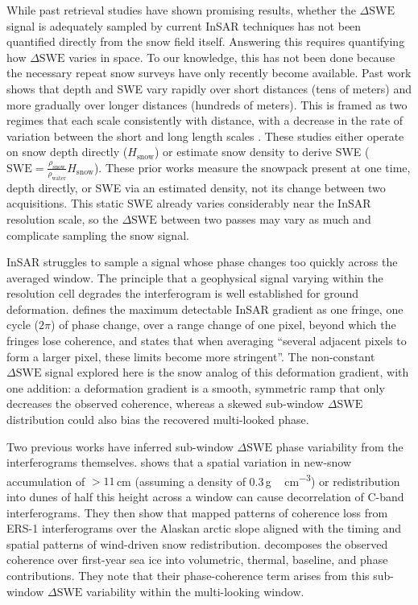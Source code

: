 \documentclass[tc, manuscript]{copernicus}
\begin{document}
While past retrieval studies have shown promising results, whether the $\Delta\mathrm{SWE}$ signal is adequately sampled by current InSAR techniques has not been quantified directly from the snow field itself. Answering this requires quantifying how $\Delta\mathrm{SWE}$ varies in space. To our knowledge, this has not been done because the necessary repeat snow surveys have only recently become available. Past work shows that depth and SWE vary rapidly over short distances (tens of meters) and more gradually over longer distances (hundreds of meters). This is framed as two regimes that each scale consistently with distance, with a decrease in the rate of variation between the short and long length scales \citep{deems2006, trujillo2007topographic-0ec, Clark2011, mendoza2020, Miller2022}. These studies either operate on snow depth directly ($H_{\mathrm{snow}}$) or estimate snow density to derive SWE ($\mathrm{SWE} = \frac{\rho_{\mathrm{snow}}}{\rho_{\mathrm{water}}} H_{\mathrm{snow}}$). These prior works measure the snowpack present at one time, depth directly, or SWE via an estimated density, not its change between two acquisitions. This static SWE already varies considerably near the InSAR resolution scale, so the $\Delta\mathrm{SWE}$ between two passes may vary as much and complicate sampling the snow signal.

InSAR struggles to sample a signal whose phase changes too quickly across the averaged window. The principle that a geophysical signal varying within the resolution cell degrades the interferogram is well established for ground deformation. \citet{Massonnet1998} defines the maximum detectable InSAR gradient as one fringe, one cycle ($2\pi$) of phase change, over a range change of one pixel, beyond which the fringes lose coherence, and states that when averaging ``several adjacent pixels to form a larger pixel, these limits become more stringent''. The non-constant $\Delta\mathrm{SWE}$ signal explored here is the snow analog of this deformation gradient, with one addition: a deformation gradient is a smooth, symmetric ramp that only decreases the observed coherence, whereas a skewed sub-window $\Delta\mathrm{SWE}$ distribution could also bias the recovered multi-looked phase.

Two previous works have inferred sub-window $\Delta\mathrm{SWE}$ phase variability from the interferograms themselves. \citet{LiSturm2002} shows that a spatial variation in new-snow accumulation of $>11$\,\unit{cm} (assuming a density of 0.3\,\unit{g\,cm^{-3}}) or redistribution into dunes of half this height across a window can cause decorrelation of C-band interferograms. They then show that mapped patterns of coherence loss from ERS-1 interferograms over the Alaskan arctic slope aligned with the timing and spatial patterns of wind-driven snow redistribution. \citet{ming2026} decomposes the observed coherence over first-year sea ice into volumetric, thermal, baseline, and phase contributions. They note that their phase-coherence term arises from this sub-window $\Delta\mathrm{SWE}$ variability within the multi-looking window.
\end{document}
